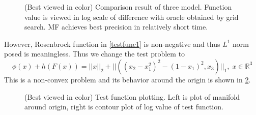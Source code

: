 \documentclass[10pt, oneside]{article}
\begin{document}
\begin{figure}[H]
\centering

   \caption{(Best viewed in color) Comparison result of three model. Function value is viewed in log scale of difference with oracle obtained by grid search. MF achieves best precision in relatively short time. }
   \label{fig:compare}
  \end{figure}
  
However, Rosenbrock function in \ref{testfunc1} is non-negative and thus $L^1$ norm posed is meaningless. Thus we change the test problem to 
\begin{equation}
\label{testfunc2}
\phi(x)+h(F(x))=||x||_2+||((x_2-x_1^2)^2-(1-x_1)^2,x_3)||_1,\;x\in \mathbb{R}^3
\end{equation}
This is a non-convex problem and its behavior around the origin is shown in \ref{fig:function2}.

\begin{figure}[H]
\centering

   \caption{(Best viewed in color) Test function plotting. Left is plot of manifold around origin, right is contour plot of log value of test function. }
\label{fig:function2}
  \end{figure}
\end{document}
